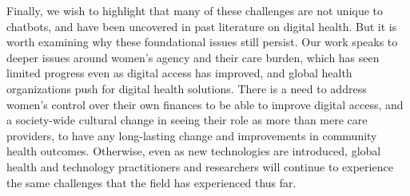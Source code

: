 Finally, we wish to highlight that many of these challenges are not unique to chatbots, and have been uncovered in past literature on digital health. But it is worth examining why these foundational issues still persist. Our work speaks to deeper issues around women's agency and their care burden, which has seen limited progress even as digital access has improved, and global health organizations push for digital health solutions. There is a need to address women's control over their own finances to be able to improve digital access, and a society-wide cultural change in seeing their role as more than mere care providers, to have any long-lasting change and improvements in community health outcomes. Otherwise, even as new technologies are introduced, global health and technology practitioners and researchers will continue to experience the same challenges that the field has experienced thus far.




